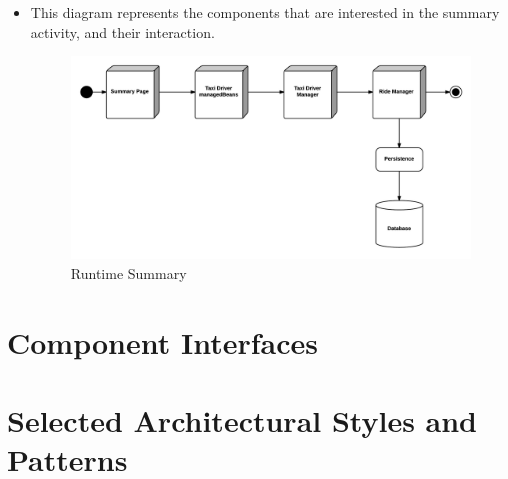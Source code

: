 \begin{itemize}
	\item This diagram represents the components that are interested in the summary activity, and their interaction.
	\begin{figure}[htbp]
	\centering
	\includegraphics[width=\textwidth]{cpt/img/RuntimeSummaryView}
	\caption{Runtime Summary}
	\end{figure}
	\clearpage

\end{itemize}

\section{Component Interfaces}

\section{Selected Architectural Styles and Patterns}
